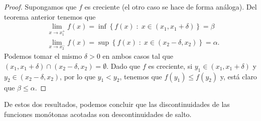\begin{proof}
Supongamos que $\displaystyle f $ es creciente (el otro caso se hace de forma análoga). Del teorema anterior tenemos que 
\[
\begin{split}
& \lim_{x \to x_{1}^{+}}f\left(x\right) = \inf \left\{ f\left(x\right) \; : \; x \in \left(x_{1}, x_{1} + \delta \right)\right\} = \beta \\
& \lim_{x \to x_{2}^{-}}f\left(x\right) = \sup \left\{ f\left(x\right) \; : \; x \in \left(x_{2}-\delta, x_{2}\right)\right\} = \alpha .
\end{split}
\]
Podemos tomar el mismo $\displaystyle \delta > 0 $ en ambos casos tal que $\displaystyle \left(x_{1}, x_{1} + \delta \right) \cap \left(x_{2}-\delta, x_{2}\right) = \emptyset $. Dado que $\displaystyle f $ es creciente, si $\displaystyle y_{1} \in \left(x_{1}, x_{1} + \delta \right) $ y $\displaystyle y_{2} \in \left(x_{2}-\delta, x_{2}\right) $, por lo que $\displaystyle y_{1} < y_{2} $, tenemos que $\displaystyle f\left(y_{1}\right) \leq f\left(y_{2}\right) $ y, está claro que $\displaystyle \beta \leq \alpha  $.
\end{proof}
\begin{observation}
\normalfont De estos dos resultados, podemos concluir que las discontinuidades de las funciones monótonas acotadas son descontinuidades de salto.
\end{observation}

